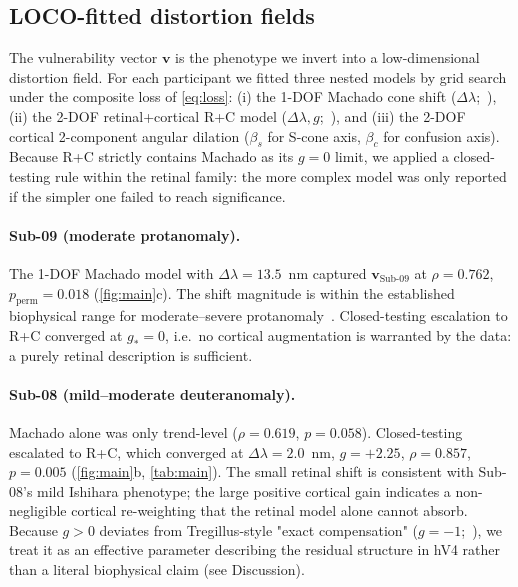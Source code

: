 \subsection{LOCO-fitted distortion fields}
\label{sec:results:inference}

The vulnerability vector $\mathbf{v}$ is the phenotype we invert into
a low-dimensional distortion field. For each participant we fitted
three nested models by grid search under the composite loss of
\cref{eq:loss}: (i) the 1-DOF Machado cone shift
($\Delta\lambda$;~\citealp{machado2009}), (ii) the 2-DOF
retinal+cortical R+C model ($\Delta\lambda, g$;~\citealp{tregillus2021}),
and (iii) the 2-DOF cortical 2-component angular dilation
($\beta_s$ for S-cone axis, $\beta_c$ for confusion axis). Because
R+C strictly contains Machado as its $g{=}0$ limit, we applied a
closed-testing rule within the retinal family: the more complex
model was only reported if the simpler one failed to reach
significance.

\paragraph{Sub-09 (moderate protanomaly).}
The 1-DOF Machado model with $\Delta\lambda = 13.5$~nm captured
$\mathbf{v}_{\text{Sub-09}}$ at $\rho = 0.762$, $p_{\text{perm}} = 0.018$
(\cref{fig:main}c). The shift magnitude is within the established
biophysical range for moderate--severe
protanomaly~\citep{machado2009, neitz2011}. Closed-testing escalation
to R+C converged at $g_{\ast} = 0$, i.e.\ no cortical augmentation is
warranted by the data: a purely retinal description is sufficient.

\paragraph{Sub-08 (mild--moderate deuteranomaly).}
Machado alone was only trend-level ($\rho = 0.619$, $p = 0.058$).
Closed-testing escalated to R+C, which converged at
$\Delta\lambda = 2.0$~nm, $g = +2.25$, $\rho = 0.857$, $p = 0.005$
(\cref{fig:main}b, \cref{tab:main}). The small retinal shift is
consistent with Sub-08's mild Ishihara phenotype; the large positive
cortical gain indicates a non-negligible cortical re-weighting that
the retinal model alone cannot absorb. Because $g > 0$ deviates from
Tregillus-style "exact compensation" ($g = -1$;~\citealp{tregillus2021}),
we treat it as an effective parameter describing the residual
structure in hV4 rather than a literal biophysical claim (see
Discussion).

